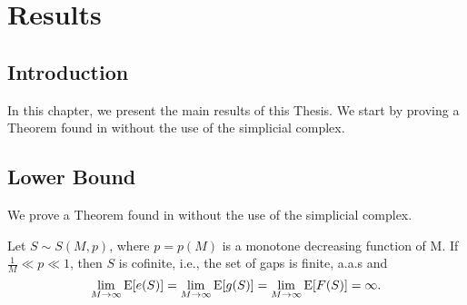 \chapter{Results}\label{chap:results}

\section{Introduction}

In this chapter, we present the main results of this Thesis. We start by proving a Theorem found in \cite{de2018random} without the use of the simplicial complex. 

\section{Lower Bound}\label{sec:results:lowerbound}

We prove a Theorem found in \cite{de2018random} without the use of the simplicial complex. 

\begin{theorem}
    Let $S \sim S(M, p)$, where $p = p(M)$ is a monotone decreasing function of M. If $\frac{1}{M} \ll p \ll 1$, then $S$ is cofinite, i.e., the set of gaps is finite, a.a.s and 
\[\lim_{M \to \infty} \mathrm{E}[e(S)] = \lim_{M \to \infty} \mathrm{E}[g(S)] = \lim_{M \to \infty} \mathrm{E}[F(S)] = \infty.\]
\end{theorem}

